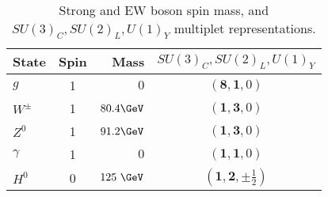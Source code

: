 \begin{table}[!htb]
\centering
\small
\begin{tabular}{|lcrc|}
\hline
State  & Spin & Mass &  $SU(3)_{C}, SU(2)_{L}, U(1)_{Y}$ \\
\hline \hline
$g$ & 1&  $0$ & $(\mathbf{8}, \mathbf{1}, 0)$ \\ 
\hline
$W^\pm$ & 1 & $80.4\GeV$ & $(\mathbf{1}, \mathbf{3}, 0)$  \\  
$Z^0$ & 1 & $91.2\GeV$ & $(\mathbf{1}, \mathbf{3}, 0)$\\ 
$\gamma$ & 1 & $0$ & $(\mathbf{1}, \mathbf{1}, 0)$ \\  
\hline
$H^0$& 0 & $125~\GeV$&$(\mathbf{1}, \mathbf{2}, \pm\frac{1}{2})$\\
\hline 

\hline
\end{tabular}
\caption{Strong and EW boson spin mass, and $SU(3)_{C}, SU(2)_{L}, U(1)_{Y}$ multiplet representations. }
\label{tab:boson}
\end{table} 

